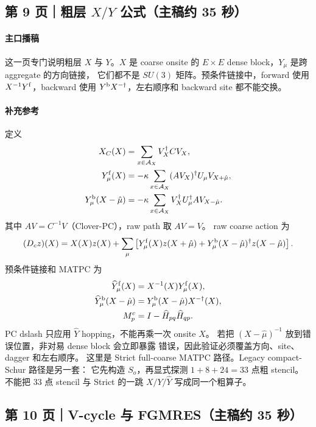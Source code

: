 \documentclass[UTF8,a4paper,11pt,fontset=none]{ctexart}
\begin{document}
\subsection{第 9 页｜粗层 \texorpdfstring{\(X/Y\)}{X/Y} 公式（主稿约 35 秒）}

\paragraph{主口播稿}
这一页专门说明粗层 \(X\) 与 \(Y\)。\(X\) 是 coarse onsite 的
\(E\times E\) dense block，\(Y_\mu\) 是跨 aggregate 的方向链接，
它们都不是 \(SU(3)\) 矩阵。预条件链接中，forward 使用
\(X^{-1}Y^{\rm f}\)，backward 使用
\(Y^{\rm b}X^{-\dagger}\)，左右顺序和 backward site 都不能交换。

\paragraph{补充参考}
定义
\begin{align}
X_C(X)&=\sum_{x\in\mathcal A_X}V_X^\dagger C V_X,\\
Y_\mu^{\rm f}(X)&=-\kappa\sum_{x\in\mathcal A_X}
(AV_X)^\dagger U_\mu V_{X+\hat\mu},\\
Y_\mu^{\rm b}(X-\hat\mu)&=-\kappa\sum_{x\in\mathcal A_X}
V_X^\dagger U^\dagger_\mu AV_{X-\hat\mu}.
\end{align}
其中 \(AV=C^{-1}V\)（Clover-PC），raw path 取 \(AV=V\)。
raw coarse action 为
\begin{equation}
(D_cz)(X)=X(X)z(X)+\sum_\mu\left[
Y_\mu^{\rm f}(X)z(X+\hat\mu)
+Y_\mu^{\rm b}(X-\hat\mu)^\dagger z(X-\hat\mu)\right].
\end{equation}
预条件链接和 MATPC 为
\begin{align}
\widehat Y_\mu^{\rm f}(X)&=X^{-1}(X)Y_\mu^{\rm f}(X),\\
\widehat Y_\mu^{\rm b}(X-\hat\mu)
&=Y_\mu^{\rm b}(X-\hat\mu)X^{-\dagger}(X),\\
M_p^c&=I-\widehat H_{pq}\widehat H_{qp}.
\end{align}
PC dslash 只应用 \(\widehat Y\) hopping，不能再乘一次 onsite \(X\)。
若把 \((X-\hat\mu)^{-1}\) 放到错误位置，非对易 dense block 会立即暴露
错误，因此验证必须覆盖方向、site、dagger 和左右顺序。
这里是 Strict full-coarse MATPC 路径。Legacy compact-Schur 路径是另一套：
它先构造 \(S_o\)，再显式探测
\(1+8+24=33\) 点粗 stencil。不能把 33 点 stencil 与 Strict 的一跳
\(X/Y/\widehat Y\) 写成同一个粗算子。

\subsection{第 10 页｜V-cycle 与 FGMRES（主稿约 35 秒）}
\end{document}
